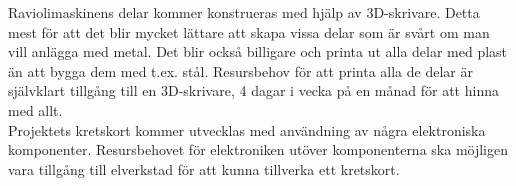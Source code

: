 Raviolimaskinens delar kommer konstrueras med hjälp av 3D-skrivare. Detta mest för att det blir mycket lättare att skapa vissa delar som är svårt om man vill anlägga med metal. Det blir också billigare och printa ut alla delar med plast än att bygga dem med t.ex. stål. Resursbehov för att printa alla de delar är självklart tillgång till en 3D-skrivare, 4 dagar i vecka på en månad för att hinna med allt.\\

Projektets kretskort kommer utvecklas med användning av några elektroniska komponenter. Resursbehovet för elektroniken utöver komponenterna ska möjligen vara tillgång till elverkstad för att kunna tillverka ett kretskort.\\

